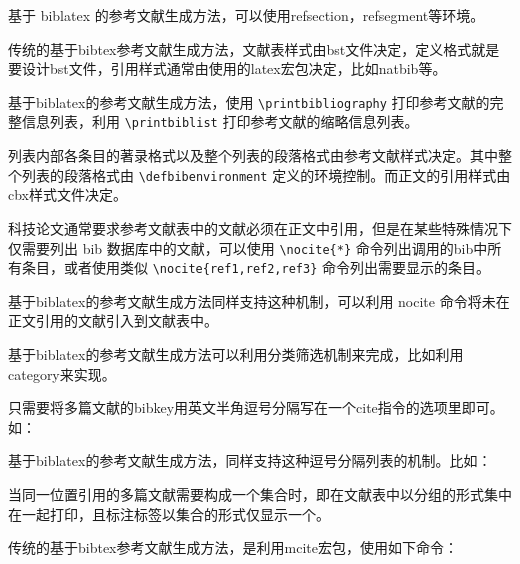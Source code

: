 基于 biblatex 的参考文献生成方法，可以使用refsection，refsegment等环境。




传统的基于bibtex参考文献生成方法，文献表样式由bst文件决定，定义格式就是要设计bst文件，引用样式通常由使用的latex宏包决定，比如natbib等。

基于biblatex的参考文献生成方法，使用 \verb|\printbibliography| 打印参考文献的完整信息列表，利用 \verb|\printbiblist| 打印参考文献的缩略信息列表。

列表内部各条目的著录格式以及整个列表的段落格式由参考文献样式决定。其中整个列表的段落格式由 \verb|\defbibenvironment| 定义的环境控制。而正文的引用样式由cbx样式文件决定。



科技论文通常要求参考文献表中的文献必须在正文中引用，但是在某些特殊情况下仅需要列出 bib 数据库中的文献，可以使用 \verb|\nocite{*}| 命令列出调用的bib中所有条目，或者使用类似 \verb|\nocite{ref1,ref2,ref3}| 命令列出需要显示的条目。

基于biblatex的参考文献生成方法同样支持这种机制，可以利用 nocite 命令将未在正文引用的文献引入到文献表中。



基于biblatex的参考文献生成方法可以利用分类筛选机制来完成，比如利用category来实现。



只需要将多篇文献的bibkey用英文半角逗号分隔写在一个cite指令的选项里即可。如：

\begin{texlist}
\cite{knuth84,lamport86}
\end{texlist}

基于biblatex的参考文献生成方法，同样支持这种逗号分隔列表的机制。比如：
\begin{texlist}
\cite{bibkey1,bibkey2,bibkey3,bibkey4}
\supercite{bibkey1,bibkey2,bibkey3,bibkey4}
\parencite{bibkey1,bibkey2,bibkey3,bibkey4}
\textcite{bibkey1,bibkey2,bibkey3,bibkey4}
\end{texlist}

当同一位置引用的多篇文献需要构成一个集合时，即在文献表中以分组的形式集中在一起打印，且标注标签以集合的形式仅显示一个。

传统的基于bibtex参考文献生成方法，是利用mcite宏包，使用如下命令：

\begin{texlist}
\cite{paper0,paper1,*paper2,*paper3}
\end{texlist}

